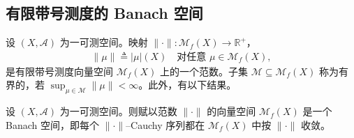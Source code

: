 \documentclass[../../main.tex]{subfiles}%
\begin{document}
\subsection{有限带号测度的 Banach 空间}\label{subsection:ch01-Banach空间}

设 $(X,\mathcal{A})$ 为一可测空间。映射 $\|\cdot\|:\mathcal{M}_f(X)\to\mathbb{R}^+$，
\begin{align*}
\|\mu\|\triangleq|\mu|(X)\quad\text{对任意 }\mu\in\mathcal{M}_f(X),
\end{align*}
是有限带号测度向量空间 $\mathcal{M}_f(X)$ 上的一个范数。子集 $\mathcal{M}\subseteq\mathcal{M}_f(X)$ 称为有界的，若 $\sup_{\mu\in\mathcal{M}}\|\mu\|<\infty$。此外，有以下结果。

\begin{proposition}\label{proposition:ch01-Banach完备}
设 $(X,\mathcal{A})$ 为一可测空间。则赋以范数 $\|\cdot\|$ 的向量空间 $\mathcal{M}_f(X)$ 是一个 Banach 空间，即每个 $\|\cdot\|$--Cauchy 序列都在 $\mathcal{M}_f(X)$ 中按 $\|\cdot\|$ 收敛。
\end{proposition}
\end{document}
